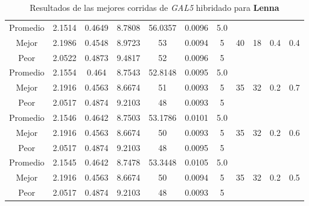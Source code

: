 \begin{table}[h!]
\begin{center}
\begin{tabular}{|c|c|c|c|c|c|c|c|c|c|c|}
        \hline
        \hline
            Promedio  & 2.1514 & 0.4649 & 8.7808 & 56.0357 & 0.0096 & 5.0 &  &  &  & \\
            \cline{1-7}
            Mejor & 2.1986 & 0.4548  & 8.9723 & 53 & 0.0094 & 5 & 40 & 18 & 0.4 & 0.4\\
            \cline{1-7}
            Peor & 2.0522 & 0.4873  & 9.4817 & 52 & 0.0096 & 5 &  &  &  & \\
        \hline
        \hline
            Promedio  & 2.1554 & 0.464 & 8.7543 & 52.8148 & 0.0095 & 5.0 &  &  &  & \\
            \cline{1-7}
            Mejor & 2.1916 & 0.4563  & 8.6674 & 51 & 0.0093 & 5 & 35 & 32 & 0.2 & 0.7\\
            \cline{1-7}
            Peor & 2.0517 & 0.4874  & 9.2103 & 48 & 0.0093 & 5 &  &  &  & \\
        \hline
        \hline
            Promedio  & 2.1546 & 0.4642 & 8.7503 & 53.1786 & 0.0101 & 5.0 &  &  &  & \\
            \cline{1-7}
            Mejor & 2.1916 & 0.4563  & 8.6674 & 50 & 0.0093 & 5 & 35 & 32 & 0.2 & 0.6\\
            \cline{1-7}
            Peor & 2.0517 & 0.4874  & 9.2103 & 48 & 0.0095 & 5 &  &  &  & \\
        \hline
        \hline
            Promedio  & 2.1545 & 0.4642 & 8.7478 & 53.3448 & 0.0105 & 5.0 &  &  &  & \\
            \cline{1-7}
            Mejor & 2.1916 & 0.4563  & 8.6674 & 50 & 0.0094 & 5 & 35 & 32 & 0.2 & 0.5\\
            \cline{1-7}
            Peor & 2.0517 & 0.4874  & 9.2103 & 48 & 0.0093 & 5 &  &  &  & \\
        \hline
        \end{tabular}
        \caption{Resultados de las mejores corridas de \emph{GAL5} hibridado para {\bf Lenna}}
        \label{tb:tableGAL5}
    \end{center}
\end{table}

